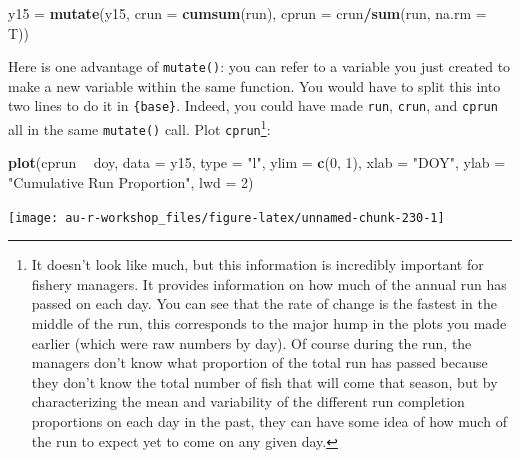 \documentclass[]{book}
\newenvironment{Shaded}{\begin{snugshade}}{\end{snugshade}}
\newcommand{\KeywordTok}[1]{\textcolor[rgb]{0.13,0.29,0.53}{\textbf{#1}}}
\newcommand{\DataTypeTok}[1]{\textcolor[rgb]{0.13,0.29,0.53}{#1}}
\newcommand{\DecValTok}[1]{\textcolor[rgb]{0.00,0.00,0.81}{#1}}
\newcommand{\StringTok}[1]{\textcolor[rgb]{0.31,0.60,0.02}{#1}}
\newcommand{\OperatorTok}[1]{\textcolor[rgb]{0.81,0.36,0.00}{\textbf{#1}}}
\newcommand{\NormalTok}[1]{#1}
\let\rmarkdownfootnote\footnote%
\def\footnote{\protect\rmarkdownfootnote}
\theoremstyle{definition}
\theoremstyle{definition}
\theoremstyle{definition}
\theoremstyle{remark}
\begin{document}
\begin{Shaded}
\begin{Highlighting}[]
\NormalTok{y15 =}\StringTok{ }\KeywordTok{mutate}\NormalTok{(y15, }\DataTypeTok{crun =} \KeywordTok{cumsum}\NormalTok{(run), }\DataTypeTok{cprun =}\NormalTok{ crun}\OperatorTok{/}\KeywordTok{sum}\NormalTok{(run, }\DataTypeTok{na.rm =}\NormalTok{ T))}
\end{Highlighting}
\end{Shaded}

Here is one advantage of \texttt{mutate()}: you can refer to a variable
you just created to make a new variable within the same function. You
would have to split this into two lines to do it in \texttt{\{base\}}.
Indeed, you could have made \texttt{run}, \texttt{crun}, and
\texttt{cprun} all in the same \texttt{mutate()} call. Plot
\texttt{cprun}\footnote{It doesn't look like much, but this information
  is incredibly important for fishery managers. It provides information
  on how much of the annual run has passed on each day. You can see that
  the rate of change is the fastest in the middle of the run, this
  corresponds to the major hump in the plots you made earlier (which
  were raw numbers by day). Of course during the run, the managers don't
  know what proportion of the total run has passed because they don't
  know the total number of fish that will come that season, but by
  characterizing the mean and variability of the different run
  completion proportions on each day in the past, they can have some
  idea of how much of the run to expect yet to come on any given day.}:

\begin{Shaded}
\begin{Highlighting}[]
\KeywordTok{plot}\NormalTok{(cprun }\OperatorTok{~}\StringTok{ }\NormalTok{doy, }\DataTypeTok{data =}\NormalTok{ y15, }\DataTypeTok{type =} \StringTok{"l"}\NormalTok{, }\DataTypeTok{ylim =} \KeywordTok{c}\NormalTok{(}\DecValTok{0}\NormalTok{, }\DecValTok{1}\NormalTok{),}
     \DataTypeTok{xlab =} \StringTok{"DOY"}\NormalTok{, }\DataTypeTok{ylab =} \StringTok{"Cumulative Run Proportion"}\NormalTok{, }\DataTypeTok{lwd =} \DecValTok{2}\NormalTok{)}
\end{Highlighting}
\end{Shaded}

\begin{center}\texttt{[image: au-r-workshop\_files/figure-latex/unnamed-chunk-230-1]} \end{center}
\end{document}
